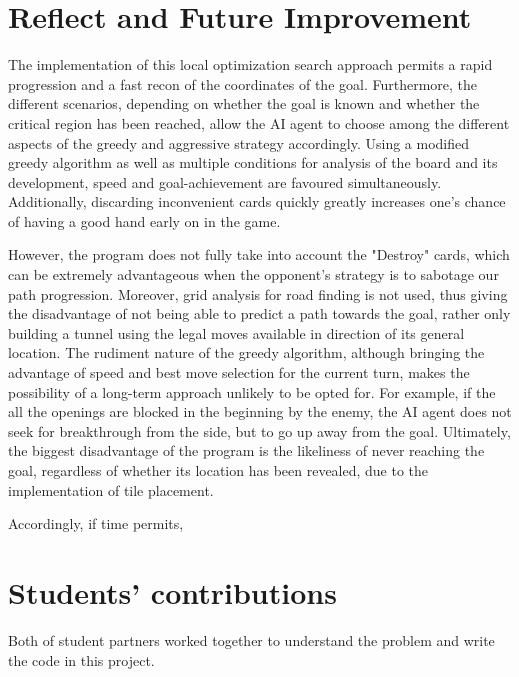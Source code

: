 \documentclass[12pt,twoside,letterpaper]{article}
\begin{document}
\section{Reflect and Future Improvement}
The implementation of this local optimization search approach permits a rapid progression and a fast recon of the coordinates of the goal. Furthermore, the different scenarios, depending on whether the goal is known and whether the critical region has been reached, allow the AI agent to choose among the different aspects of the greedy and aggressive strategy accordingly. Using a modified greedy algorithm as well as multiple conditions for analysis of the board and its development, speed and goal-achievement are favoured simultaneously. Additionally, discarding inconvenient cards quickly greatly increases one's chance of having a good hand early on in the game.
\par However, the program does not fully take into account the "Destroy" cards, which can be extremely advantageous when the opponent's strategy is to sabotage our path progression. Moreover, grid analysis for road finding is not used, thus giving the disadvantage of not being able to predict a path towards the goal, rather only building a tunnel using the legal moves available in direction of its general location. The rudiment nature of the greedy algorithm, although bringing the advantage of speed and best move selection for the current turn, makes the possibility of a long-term approach unlikely to be opted for. For example, if the all the openings are blocked in the beginning by the enemy, the AI agent does not seek for breakthrough from the side, but to go up away from the goal. Ultimately, the biggest disadvantage of the program is the likeliness of never reaching the goal, regardless of whether its location has been revealed, due to the implementation of tile placement.
\par Accordingly, if time permits,

\vfill
\section*{Students' contributions}
Both of student partners worked together to understand the problem and write the code in this project.
\end{document}
